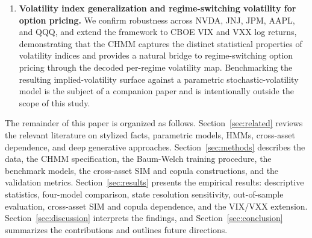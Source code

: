 \begin{enumerate}
    \item \textbf{Volatility index generalization and regime-switching volatility for option pricing.}
    We confirm robustness across NVDA, JNJ, JPM, AAPL, and QQQ, and extend the framework to CBOE VIX and VXX log returns, demonstrating that the CHMM captures the distinct statistical properties of volatility indices and provides a natural bridge to regime-switching option pricing through the decoded per-regime volatility map.
    Benchmarking the resulting implied-volatility surface against a parametric stochastic-volatility model is the subject of a companion paper and is intentionally outside the scope of this study.
\end{enumerate}

The remainder of this paper is organized as follows.
Section~\ref{sec:related} reviews the relevant literature on stylized facts, parametric models, HMMs, cross-asset dependence, and deep generative approaches.
Section~\ref{sec:methods} describes the data, the CHMM specification, the Baum-Welch training procedure, the benchmark models, the cross-asset SIM and copula constructions, and the validation metrics.
Section~\ref{sec:results} presents the empirical results: descriptive statistics, four-model comparison, state resolution sensitivity, out-of-sample evaluation, cross-asset SIM and copula dependence, and the VIX/VXX extension.
Section~\ref{sec:discussion} interprets the findings, and Section~\ref{sec:conclusion} summarizes the contributions and outlines future directions.
